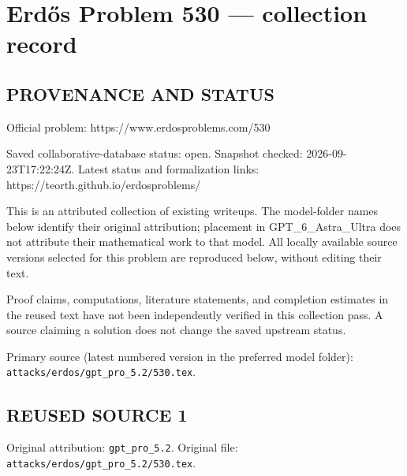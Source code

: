 \section*{Erd\H{o}s Problem 530 --- collection record}

\subsection*{PROVENANCE AND STATUS}
Official problem: https://www.erdosproblems.com/530

Saved collaborative-database status: open.
Snapshot checked: 2026-09-23T17:22:24Z.
Latest status and formalization links: https://teorth.github.io/erdosproblems/

This is an attributed collection of existing writeups. The model-folder names below identify their original attribution; placement in GPT\_6\_Astra\_Ultra does not attribute their mathematical work to that model. All locally available source versions selected for this problem are reproduced below, without editing their text.

Proof claims, computations, literature statements, and completion estimates in the reused text have not been independently verified in this collection pass. A source claiming a solution does not change the saved upstream status.

Primary source (latest numbered version in the preferred model folder): \texttt{attacks/erdos/gpt\_pro\_5.2/530.tex}.

\subsection*{REUSED SOURCE 1}
Original attribution: \texttt{gpt\_pro\_5.2}.
Original file: \texttt{attacks/erdos/gpt\_pro\_5.2/530.tex}.


